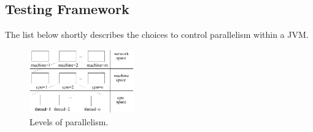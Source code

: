 \subsection{Testing Framework}

The list below shortly describes the choices to control parallelism
within a JVM.

\begin{figure}[t!]
  \centering
  \includegraphics[width=0.4\textwidth]{figs/parallel-levels.pdf}
  \caption{\label{fig:levels}Levels of parallelism.}
\end{figure}

\newcommand{\Seq}{L0}
\newcommand{\ParClassSeqMeth}{L1}
\newcommand{\SeqClassParMeth}{L2}
\newcommand{\ParClassParMeth}{L3}

